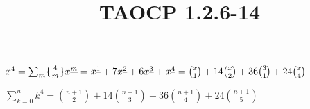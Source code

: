 \documentclass{article}
\title{TAOCP 1.2.6\mbox{-}14}
\begin{document}
\maketitle

\( x^{4} = \sum_{m}\{{4\atop m} \}x^{\underline{m}} = x^{\underline{1}} + 7 x^{\underline{2}} + 6 x^{\underline{3}} + x^{\underline{4}} = \binom{x}{1} + 14 \binom{x}{2} + 36 \binom{3}{1} + 24 \binom{x}{4} \)

\( \sum_{k=0}^{n} k^{4} = \binom{n+1}{2} + 14 \binom{n+1}{3} + 36 \binom{n+1}{4} + 24 \binom{n+1}{5} \)
\end{document}
